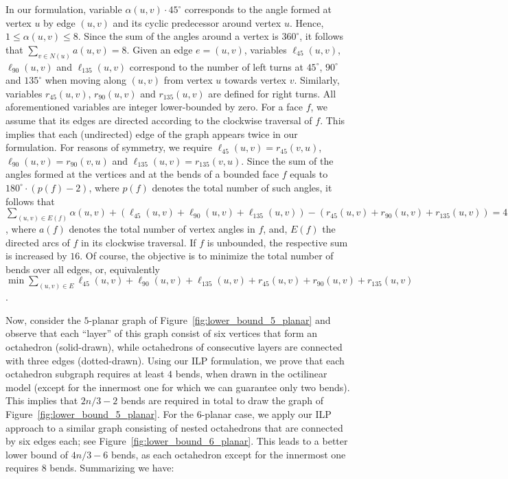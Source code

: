 \documentclass[a4paper,twoside,11pt]{article}
\begin{document}
In our formulation, variable $\alpha(u,v) \cdot 45^\circ$
corresponds to the angle formed at vertex $u$ by edge $(u,v)$
and its cyclic predecessor around vertex $u$. Hence, $1 \leq
\alpha(u,v) \leq 8$. Since the sum of the angles around a vertex
is $360^\circ$, it follows that $\sum_{v \in N(u)}a(u,v) =
8$.  Given an edge $e=(u,v)$, variables $\ell_{45}(u,v)$,
$\ell_{90}(u,v)$ and $\ell_{135}(u,v)$ correspond to the number of
left turns at $45^\circ$, $90^\circ$ and $135^\circ$ when moving
along $(u,v)$ from vertex $u$ towards vertex $v$. Similarly,
variables $r_{45}(u,v)$, $r_{90}(u,v)$ and $r_{135}(u,v)$ are
defined for right turns. All aforementioned variables are integer
lower-bounded by zero. For a face $f$, we assume that
its edges are directed according to the clockwise traversal of $f$.
This implies that each (undirected) edge of the graph appears twice
in our formulation.  For reasons of symmetry, we require
$\ell_{45}(u,v) = r_{45}(v,u)$, $\ell_{90}(u,v) = r_{90}(v,u)$ and
$\ell_{135}(u,v) = r_{135}(v,u)$. Since the sum of the angles formed
at the vertices and at the bends of a bounded face $f$ equals to
$180^\circ\cdot(p(f)-2)$, where $p(f)$ denotes the total number of
such angles, it follows that $\sum_{(u,v) \in
E(f)}\alpha(u,v)+(\ell_{45}(u,v)+\ell_{90}(u,v)+\ell_{135}(u,v)) -
(r_{45}(u,v)+r_{90}(u,v)+r_{135}(u,v))=4a(f)-8$, where $a(f)$
denotes the total number of vertex angles in $f$, and, $E(f)$ the
directed arcs of $f$ in its clockwise traversal. If $f$ is
unbounded, the respective sum is increased by $16$. Of course, the
objective is to minimize the total number of bends over all edges,
or, equivalently $\min \sum_{(u,v)\in E}\ell_{45}(u,v)
+ \ell_{90}(u,v) + \ell_{135}(u,v) + r_{45}(u,v)+r_{90}(u,v)
+ r_{135}(u,v)$.

Now, consider the $5$-planar graph of
Figure~\ref{fig:lower_bound_5_planar} and observe that each ``layer''
of this graph consist of six vertices that form an octahedron
(solid-drawn), while octahedrons of consecutive layers are connected
with three edges (dotted-drawn). Using our ILP formulation, we prove
that each octahedron subgraph requires at least $4$ bends, when drawn
in the octilinear model (except for the innermost one for which we
can guarantee only two bends). This implies that $2n/3-2$ bends are
required in total to draw the graph of
Figure~\ref{fig:lower_bound_5_planar}. For the $6$-planar case, we
apply our ILP approach to a similar graph consisting of nested
octahedrons that are connected by six edges each; see
Figure~\ref{fig:lower_bound_6_planar}. This leads to a better lower
bound of $4n/3-6$ bends, as each octahedron except for the innermost
one requires $8$ bends. Summarizing we have:
\end{document}
